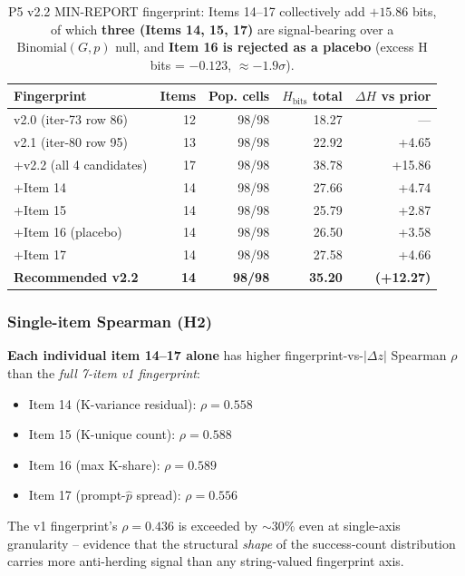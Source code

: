 \begin{table}[ht]
\centering
\small
\caption{P5 v2.2 MIN-REPORT fingerprint: Items 14--17 collectively add
$+15.86$ bits, of which \textbf{three (Items 14, 15, 17)} are signal-bearing
over a $\mathrm{Binomial}(G,p)$ null, and \textbf{Item 16 is rejected as
a placebo} (excess H bits = $-0.123$, $\approx -1.9\sigma$).}
\label{tab:p5-v22-uplift}
\begin{tabular}{l r r r r}
\toprule
Fingerprint & Items & Pop. cells & $H_{\mathrm{bits}}$ total & $\Delta H$ vs prior \\
\midrule
v2.0 (iter-73 row 86)        & 12  & 98/98 & 18.27 & --- \\
v2.1 (iter-80 row 95)        & 13  & 98/98 & 22.92 & +4.65 \\
+v2.2 (all 4 candidates)     & 17  & 98/98 & 38.78 & +15.86 \\
\quad +Item 14               & 14 & 98/98 & 27.66 & +4.74 \\
\quad +Item 15               & 14 & 98/98 & 25.79 & +2.87 \\
\quad +Item 16 (placebo)     & 14 & 98/98 & 26.50 & +3.58 \\
\quad +Item 17               & 14 & 98/98 & 27.58 & +4.66 \\
\midrule
\textbf{Recommended v2.2}    & \textbf{14} & \textbf{98/98} & \textbf{35.20} & \textbf{(+12.27)} \\
\bottomrule
\end{tabular}
\end{table}

\subsubsection{Single-item Spearman (H2)}
\textbf{Each individual item 14--17 alone} has higher fingerprint-vs-$|\Delta z|$
Spearman $\rho$ than the \emph{full 7-item v1 fingerprint}:
\begin{itemize}
  \item Item 14 (K-variance residual): $\rho = 0.558$
  \item Item 15 (K-unique count): $\rho = 0.588$
  \item Item 16 (max K-share): $\rho = 0.589$
  \item Item 17 (prompt-$\hat p$ spread): $\rho = 0.556$
\end{itemize}
The v1 fingerprint's $\rho = 0.436$ is exceeded by $\sim 30\%$ even at
single-axis granularity -- evidence that the structural \emph{shape} of
the success-count distribution carries more anti-herding signal than
any string-valued fingerprint axis.

